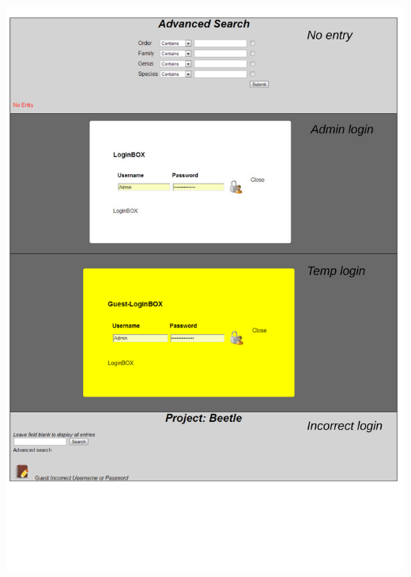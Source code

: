 \documentclass[12pt,a4paper]{article}
\begin{document}
\includegraphics[height=225mm]{UI2.pdf}
\newpage
\end{document}
